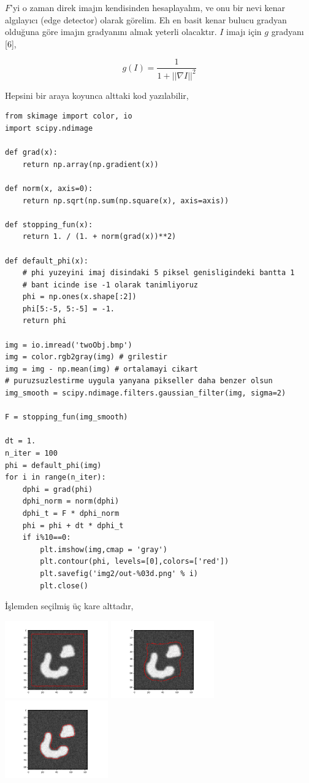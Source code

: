 \documentclass[12pt,fleqn]{article}\usepackage{../../common}
\begin{document}
$F$'yi o zaman direk imajın kendisinden hesaplayalım, ve onu bir nevi kenar
algılayıcı (edge detector) olarak görelim. Eh en basit kenar bulucu gradyan
olduğuna göre imajın gradyanını almak yeterli olacaktır. $I$ imajı için $g$
gradyanı [6],

$$
g(I) = \frac{1}{1  + || \nabla I ||^2}
$$

Hepsini bir araya koyunca alttaki kod yazılabilir,

\begin{verbatim}
from skimage import color, io
import scipy.ndimage

def grad(x):
    return np.array(np.gradient(x))

def norm(x, axis=0):
    return np.sqrt(np.sum(np.square(x), axis=axis))

def stopping_fun(x):
    return 1. / (1. + norm(grad(x))**2)

def default_phi(x):
    # phi yuzeyini imaj disindaki 5 piksel genisligindeki bantta 1
    # bant icinde ise -1 olarak tanimliyoruz
    phi = np.ones(x.shape[:2])
    phi[5:-5, 5:-5] = -1.
    return phi

img = io.imread('twoObj.bmp')
img = color.rgb2gray(img) # grilestir
img = img - np.mean(img) # ortalamayi cikart
# puruzsuzlestirme uygula yanyana pikseller daha benzer olsun
img_smooth = scipy.ndimage.filters.gaussian_filter(img, sigma=2)

F = stopping_fun(img_smooth)

dt = 1.
n_iter = 100
phi = default_phi(img)
for i in range(n_iter):
    dphi = grad(phi)
    dphi_norm = norm(dphi)
    dphi_t = F * dphi_norm
    phi = phi + dt * dphi_t
    if i%10==0:
        plt.imshow(img,cmap = 'gray')
        plt.contour(phi, levels=[0],colors=['red'])
        plt.savefig('img2/out-%03d.png' % i)
        plt.close()
\end{verbatim}

İşlemden seçilmiş üç kare alttadır,

\includegraphics[width=12em]{img2/out-000.png}
\includegraphics[width=12em]{img2/out-020.png}
\includegraphics[width=12em]{img2/out-090.png}
\end{document}
